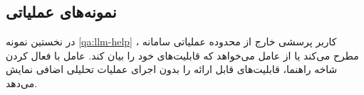 \documentclass[a4paper,fleqn]{report}
\begin{document}
\subsection{نمونه‌های عملیاتی}

در نخستین نمونه
\ref{qa:llm-help}
، کاربر پرسشی خارج از محدوده عملیاتی سامانه مطرح می‌کند یا از عامل می‌خواهد که قابلیت‌های خود را بیان کند. عامل با فعال کردن شاخه راهنما، قابلیت‌های قابل ارائه را بدون اجرای عملیات تحلیلی اضافی نمایش می‌دهد.

\end{document}
